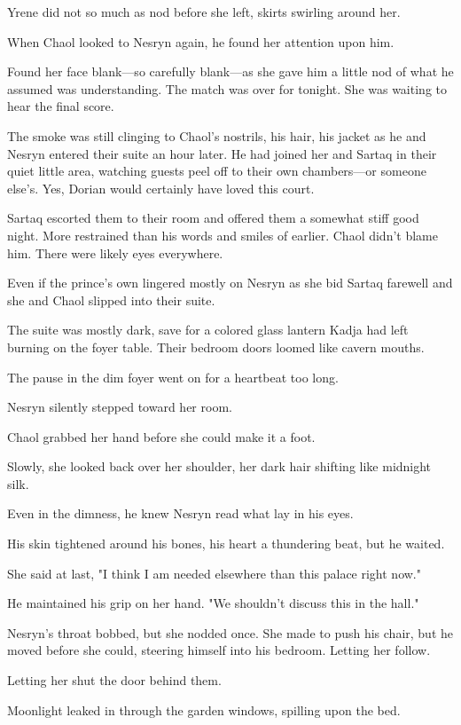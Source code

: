 Yrene did not so much as nod before she left, skirts swirling around her.

When Chaol looked to Nesryn again, he found her attention upon him.

Found her face blank---so carefully blank---as she gave him a little nod of what he assumed was understanding.
The match was over for tonight.
She was waiting to hear the final score.

The smoke was still clinging to Chaol's nostrils, his hair, his jacket as he and Nesryn entered their suite an hour later.
He had joined her and Sartaq in their quiet little area, watching guests peel off to their own chambers---or someone else's.
Yes, Dorian would certainly have loved this court.

Sartaq escorted them to their room and offered them a somewhat stiff good night.
More restrained than his words and smiles of earlier.
Chaol didn't blame him.
There were likely eyes everywhere.

Even if the prince's own lingered mostly on Nesryn as she bid Sartaq farewell and she and Chaol slipped into their suite.

The suite was mostly dark, save for a colored glass lantern Kadja had left burning on the foyer table.
Their bedroom doors loomed like cavern mouths.

The pause in the dim foyer went on for a heartbeat too long.

Nesryn silently stepped toward her room.

Chaol grabbed her hand before she could make it a foot.

Slowly, she looked back over her shoulder, her dark hair shifting like midnight silk.

Even in the dimness, he knew Nesryn read what lay in his eyes.

His skin tightened around his bones, his heart a thundering beat, but he waited.

She said at last, "I think I am needed elsewhere than this palace right now."

He maintained his grip on her hand.
"We shouldn't discuss this in the hall."

Nesryn's throat bobbed, but she nodded once.
She made to push his chair, but he moved before she could, steering himself into his bedroom.
Letting her follow.

Letting her shut the door behind them.

Moonlight leaked in through the garden windows, spilling upon the bed.

